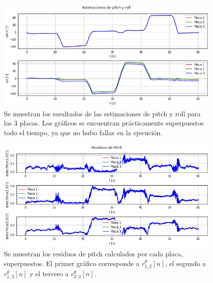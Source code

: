 \begin{figure}[H]
    \centering
    \includegraphics[width=\textwidth]{img/resultados_pitch_roll_bias_giroscopo.png}
    \caption{Se muestran los resultados de las estimaciones de pitch y roll para las 3 placas. Los gráficos se encuentran prácticamente superpuestos todo el tiempo, ya que no hubo fallas en la ejecución.}
    \label{fig:resultados_pitch_roll_bias_giroscopo}
\end{figure}

\begin{figure}[H]
    \centering
    \includegraphics[width=\textwidth]{img/resultados_residuos_pitch_bias_giroscopo.png}
    \caption{Se muestran los residuos de pitch calculados por cada placa, superpuestos. El primer gráfico corresponde a $r_{1,2}^{\theta}[n]$, el segundo a $r_{1,3}^{\theta}[n]$ y el tercero a $r_{2,3}^{\theta}[n]$.}
    \label{fig:resultados_residuos_pitch_bias_giroscopo}
\end{figure}

